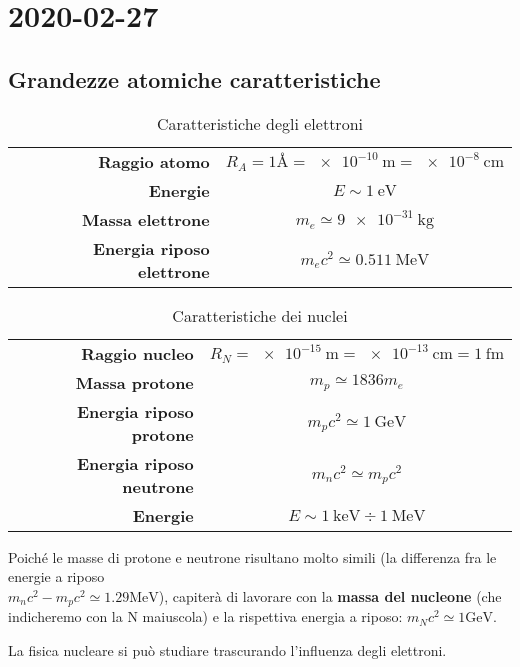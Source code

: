\chapter{2020-02-27} %
\section{Grandezze atomiche caratteristiche}
\begin{table}[h!]
  \centering
  \caption{Caratteristiche degli elettroni}
  \begin{tabular}{r|c}
    \textbf{Raggio atomo} & $R_A = 1\si{\angstrom} =
    \SI{e-10}{\m} = \SI{e-8}{\cm}$
    \\
    \textbf{Energie} & $E \sim \SI{1}{\eV}$
    \\
    \textbf{Massa elettrone} & $m_e \simeq \SI{9e-31}{\kg}$
    \\
    \textbf{Energia riposo elettrone} & $m_ec^2 \simeq \SI{0.511}{\MeV}$
  \end{tabular}
\end{table}

\begin{table}[h!]
  \centering
  \caption{Caratteristiche dei nuclei}
  \begin{tabular}{r|c}
    \textbf{Raggio nucleo} & $R_N = \SI{e-15}{\m} =
    \SI{e-13}{\cm} = \SI{1}{\femto\m}$
    \\
    \textbf{Massa protone} & $m_p \simeq 1836 m_e$
    \\
    \textbf{Energia riposo protone} & $m_pc^2 \simeq \SI{1}{\GeV}$
    \\
    \textbf{Energia riposo neutrone} & $m_nc^2 \simeq m_pc^2$
    \\
    \textbf{Energie} & $E \sim \SI{1}{\keV} \div \SI{1}{\MeV}$
  \end{tabular}
\end{table}
Poiché le masse di protone e neutrone risultano molto simili (la differenza fra
le energie a riposo\\ $m_nc^2 - m_pc^2 \simeq 1.29\si{\MeV}$), capiterà di
lavorare con la \textbf{massa del nucleone} (che indicheremo con la N
maiuscola) e la rispettiva energia a riposo: $m_Nc^2 \simeq 1\si{\GeV}$.\par
La fisica nucleare si può studiare trascurando l'influenza degli elettroni.

